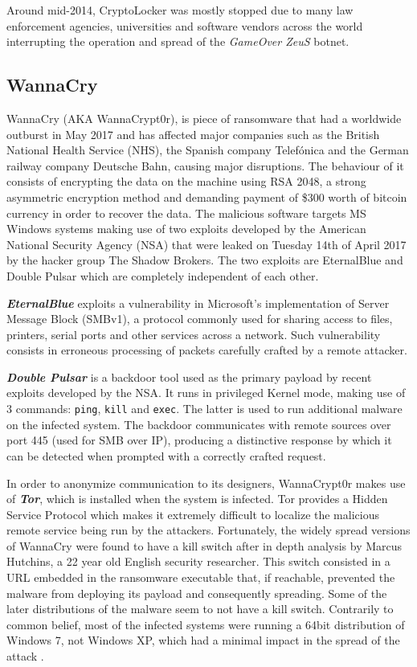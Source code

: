 \documentclass[10pt,a4paper]{article}
\begin{document}
Around mid-2014, CryptoLocker was mostly stopped due to many law enforcement agencies, universities and software vendors across the world interrupting the operation and spread of the \textit{GameOver ZeuS} botnet.

\subsection{WannaCry}
WannaCry (AKA WannaCrypt0r), is piece of ransomware that had a worldwide outburst in May 2017 and has affected major companies such as the British National Health Service (NHS), the Spanish company Telefónica and the German railway company Deutsche Bahn, causing major disruptions. The behaviour of it consists of encrypting the data on the machine using RSA 2048, a strong asymmetric encryption method and demanding payment of \$300 worth of bitcoin currency in order to recover the data. The malicious software targets MS Windows systems making use of two exploits developed by the American National Security Agency (NSA) that were leaked on Tuesday 14th of April 2017 by the hacker group The Shadow Brokers. The two exploits are EternalBlue and Double Pulsar which are completely independent of each other.

\textbf{\textit{EternalBlue}} exploits a vulnerability in Microsoft's implementation of Server Message Block (SMBv1), a protocol commonly used for sharing access to files, printers, serial ports and other services across a network. Such vulnerability consists in erroneous processing of packets carefully crafted by a remote attacker.

\textbf{\textit{Double Pulsar}} is a backdoor tool used as the primary payload by recent exploits developed by the NSA. It runs in privileged Kernel mode, making use of 3 commands: \texttt{ping}, \texttt{kill} and \texttt{exec}. The latter is used to run additional malware on the infected system. The backdoor communicates with remote sources over port 445 (used for SMB over IP), producing a distinctive response by which it can be detected when prompted with a correctly crafted request.

In order to anonymize communication to its designers, WannaCrypt0r makes use of \textit{\textbf{Tor}}, which is installed when the system is infected. Tor provides a Hidden Service Protocol \cite{torcircuits} which makes it extremely difficult to localize the malicious remote service being run by the attackers.
Fortunately, the widely spread versions of WannaCry were found to have a kill switch after in depth analysis by Marcus Hutchins, a 22 year old English security researcher. This switch consisted in a URL  embedded in the ransomware executable that, if reachable, prevented the malware from deploying its payload and consequently spreading. Some of the later distributions of the malware seem to not have a kill switch. Contrarily to common belief, most of the infected systems were running a 64bit distribution of Windows 7, not Windows XP, which had a minimal impact in the spread of the attack \cite{wanacrySystems}.
\end{document}

